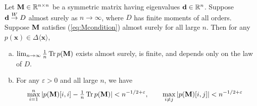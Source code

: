 \documentclass[10pt,reqno]{amsart}
\def\R{\mathbb{R}}
\def\toW{\overset{W}{\to}}
\def\bx{\mathbf{x}}
\def\eps{\varepsilon}
\def\Tr{\operatorname{Tr}}
\begin{document}
\begin{lemma}\label{lemma:syminvariantb2}
Let $\bM \in \R^{n \times n}$ be a symmetric matrix having eigenvalues
$\bd \in \R^n$. Suppose $\bd \toW D$ almost surely as $n \to \infty$, where
$D$ has finite moments of all orders. Suppose $\mathbf{M}$ satisfies
(\ref{eq:Mcondition}) almost surely for all large $n$.
Then for any $p(\bx) \in \Delta\langle \bx \rangle$,
\begin{enumerate}[(a)]
\item $\lim_{n \to \infty} \frac{1}{n} \Tr p(\bM)$ exists almost
surely, is finite, and depends only on the law of $D$.
\item For any $\eps>0$ and all large $n$, we have
\[\max_{i=1}^n |p(\bM)[i,i]-\tfrac{1}{n}\Tr p(\bM)|<n^{-1/2+\eps},
\qquad \max_{i \neq j} |p(\bM)[i,j]|<n^{-1/2+\eps}\]
\end{enumerate}
\end{lemma}
\end{document}
